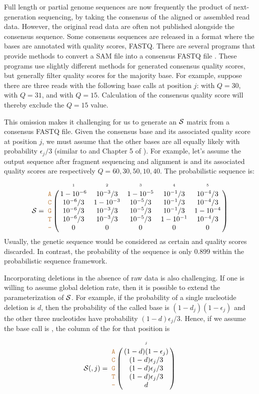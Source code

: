 \documentclass[10pt]{article}
\begin{document}
Full length or partial genome sequences are now frequently the product of next-generation sequencing, by taking the consensus of the aligned or assembled read data.
However, the original read data are often not published alongside the consensus sequence.
Some consensus sequences are released in a format where the bases are annotated with quality scores, \eg FASTQ.
There are several programs that provide methods to convert a SAM file into a consensus FASTQ file \citep{liAdjustQualityScores2004, keithSimulatedAnnealingAlgorithm2002, liMappingShortDNA2008a}.
These programs use slightly different methods for generated consensus quality scores, but generally filter quality scores for the majority base.
For example, suppose there are three reads with the following base calls at position $j$:  with $Q=30$,  with $Q=31$, and  with $Q=15$.
Calculation of the consensus quality score will thereby exclude the $Q=15$ value.


This omission makes it challenging for us to generate an $\mathcal{S}$ matrix from a consensus FASTQ file.
Given the consensus base and its associated quality score at position $j$, we must assume that the other bases are all equally likely with probability $\epsilon_j/3$ (similar to \cite{kuoEAGLEExplicitAlternative2018} and Chapter 5 of \citet{kozlovModelsOptimizationsTools2018}).
For example, let's assume the output sequence after fragment sequencing and alignment is  and its associated quality scores are respectively $Q=60,30,50,10,40$.
The probabilistic sequence is:
\begin{equation}
\nps = 
\bordermatrix{
&\scriptscriptstyle{1} & \scriptscriptstyle{2}& \scriptscriptstyle{3}& \scriptscriptstyle{4} & \scriptscriptstyle{5} \cr
\sq{A} & 1-10^{-6} & 10^{-3}/3  & 1-10^{-5} & 10^{-1}/3 & 10^{-4}/3  \cr
\sq{C} & 10^{-6}/3 & 1-10^{-3}  & 10^{-5}/3 & 10^{-1}/3 & 10^{-4}/3  \cr
\sq{G} & 10^{-6}/3 & 10^{-3}/3  & 10^{-5}/3 & 10^{-1}/3 & 1-10^{-4} \cr
\sq{T} & 10^{-6}/3 & 10^{-3}/3  & 10^{-5}/3 & 1-10^{-1} & 10^{-4}/3 \cr
\sq{-} & 0 & 0 & 0 & 0 & 0 \cr
}
\end{equation}
Usually, the genetic sequence  would be considered as certain and quality scores discarded.
In contrast, the probability of the sequence  is only 0.899 within the probabilistic sequence framework.


Incorporating deletions in the absence of raw data is also challenging.
If one is willing to assume global deletion rate, then it is possible to extend the parameterization of $\mathcal{S}$.
For example, if the probability of a single nucleotide deletion is $d$, then the probability of the called base is $(1-d_j)(1-\epsilon_j)$ and the other three nucleotides have probability $(1-d)\epsilon_j/3$.
Hence, if we assume the base call is , the column of the \nlps for that position is
\begin{equation}
\nps(,j) = 
\bordermatrix{
&\scriptscriptstyle{j}  \cr
\sq{A} & (1 - d)(1-\epsilon_j) \cr
\sq{C} & (1 - d)\epsilon_j/3 \cr
\sq{G} & (1 - d)\epsilon_j/3 \cr
\sq{T} & (1 - d)\epsilon_j/3 \cr
\sq{-} & d \cr
}
\label{eq:deletion}
\end{equation}
\end{document}
